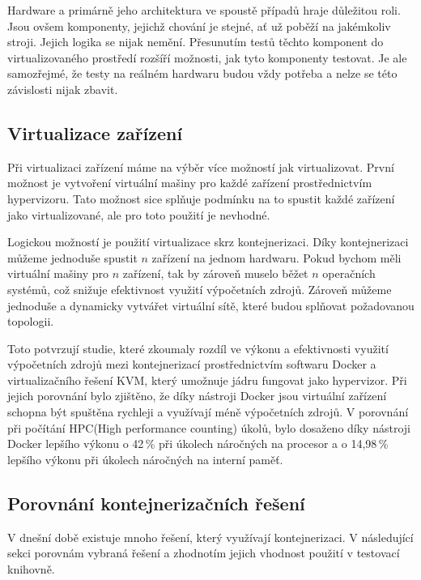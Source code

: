 Hardware a primárně jeho architektura ve spoustě případů hraje důležitou roli. Jsou ovšem komponenty, jejichž chování je stejné, ať už poběží na jakémkoliv stroji. Jejich logika se nijak nemění. Přesunutím testů těchto komponent do virtualizovaného prostředí rozšíří možnosti, jak tyto komponenty testovat. 
Je ale samozřejmé, že testy na reálném hardwaru budou vždy potřeba a nelze se této závislosti nijak zbavit.

\subsection{Virtualizace zařízení}

Při virtualizaci zařízení máme na výběr více možností jak virtualizovat. První možnost je vytvoření virtuální mašiny pro každé zařízení prostřednictvím hypervizoru. Tato možnost sice splňuje podmínku na to spustit každé zařízení jako virtualizované, ale pro toto použití je nevhodné. 

Logickou možností je použití virtualizace skrz kontejnerizaci. Díky kontejnerizaci můžeme jednoduše spustit $n$ zařízení na jednom hardwaru. Pokud bychom měli virtuální mašiny pro $n$ zařízení, tak by zároveň muselo běžet $n$ operačních systémů, což snižuje efektivnost využití výpočetních zdrojů. Zároveň můžeme jednoduše a dynamicky vytvářet virtuální sítě, které budou splňovat požadovanou topologii. 

Toto potvrzují studie, které zkoumaly rozdíl ve výkonu a efektivnosti využití výpočetních zdrojů mezi kontejnerizací prostřednictvím softwaru Docker a virtualizačního řešení KVM, který umožnuje jádru fungovat jako hypervizor. Při jejich porovnání bylo zjištěno, že díky nástroji Docker jsou virtuální zařízení schopna být spuštěna rychleji a využívají méně výpočetních zdrojů. V porovnání při počítání HPC(High performance counting) úkolů, bylo dosaženo díky nástroji Docker lepšího výkonu o 42\,\% při úkolech náročných na procesor a o 14,98\,\% lepšího výkonu při úkolech náročných na interní paměť.\cite{kvmdockercomp}\cite{2021virt} 


\subsection{Porovnání kontejnerizačních řešení}

V dnešní době existuje mnoho řešení, který využívají kontejnerizaci. V následující sekci porovnám vybraná řešení a zhodnotím jejich vhodnost použití v testovací knihovně. 


